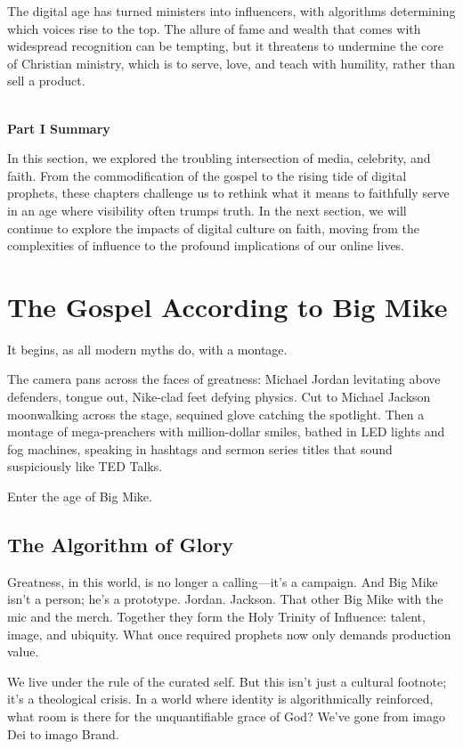 \documentclass[a4paper,11pt]{book}
\begin{document}
The digital age has turned ministers into influencers, with algorithms determining which voices rise to the top. The allure of fame and wealth that comes with widespread recognition can be tempting, but it threatens to undermine the core of Christian ministry, which is to serve, love, and teach with humility, rather than sell a product.

\textbf{\\Part I Summary\\}

In this section, we explored the troubling intersection of media, celebrity, and faith. From the commodification of the gospel to the rising tide of digital prophets, these chapters challenge us to rethink what it means to faithfully serve in an age where visibility often trumps truth. In the next section, we will continue to explore the impacts of digital culture on faith, moving from the complexities of influence to the profound implications of our online lives.

\chapter{The Gospel According to Big Mike}

It begins, as all modern myths do, with a montage.

The camera pans across the faces of greatness: Michael Jordan levitating above defenders, tongue out, Nike-clad feet defying physics. Cut to Michael Jackson moonwalking across the stage, sequined glove catching the spotlight. Then a montage of mega-preachers with million-dollar smiles, bathed in LED lights and fog machines, speaking in hashtags and sermon series titles that sound suspiciously like TED Talks.

Enter the age of Big Mike.

\section{The Algorithm of Glory}

Greatness, in this world, is no longer a calling—it’s a campaign. And Big Mike isn’t a person; he’s a prototype. Jordan. Jackson. That other Big Mike with the mic and the merch. Together they form the Holy Trinity of Influence: talent, image, and ubiquity. What once required prophets now only demands production value.

We live under the rule of the curated self. But this isn’t just a cultural footnote; it’s a theological crisis. In a world where identity is algorithmically reinforced, what room is there for the unquantifiable grace of God? We’ve gone from imago Dei to imago Brand.
\end{document}
